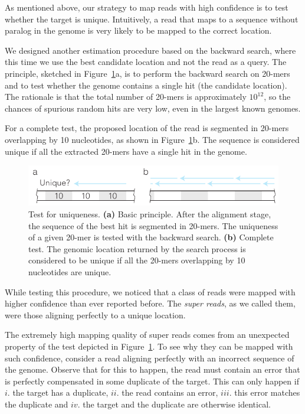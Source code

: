 \documentclass[a4,center,fleqn]{NAR}
\begin{document}
As mentioned above, our strategy to map reads with high confidence is to
test whether the target is unique. Intuitively, a read that maps to a
sequence without paralog in the genome is very likely to be mapped to the
correct location.

We designed another estimation procedure based on the backward search,
where this time we use the best candidate location and not the read as a
query. The principle, sketched in Figure~\ref{fig_supertest}a, is to
perform the backward search on 20-mers and to test whether the genome
contains a single hit (the candidate location). The rationale is that the
total number of 20-mers is approximately $10^{12}$, so the chances of
spurious random hits are very low, even in the largest known genomes.

For a complete test, the proposed location of the read is segmented in
20-mers overlapping by 10 nucleotides, as shown in
Figure~\ref{fig_supertest}b. The sequence is considered unique if all the
extracted 20-mers have a single hit in the genome.

\begin{figure}[t]
\begin{center}
\includegraphics[scale=.75]{supertest.pdf}
\end{center}
\caption{Test for uniqueness. \textbf{(a)} Basic principle. After the
alignment stage, the sequence of the best hit is segmented in 20-mers. The
uniqueness of a given 20-mer is tested with the backward search.
\textbf{(b)} Complete test. The genomic location returned by the search
process is considered to be unique if all the 20-mers overlapping by 10
nucleotides are unique.}
\label{fig_supertest}
\end{figure}

While testing this procedure, we noticed that a class of reads were mapped
with higher confidence than ever reported before. The \emph{super reads},
as we called them, were those aligning perfectly to a unique location.

The extremely high mapping quality of super reads comes from an unexpected
property of the test depicted in Figure~\ref{fig_supertest}. To see why
they can be mapped with such confidence, consider a read aligning
perfectly with an incorrect sequence of the genome. Observe that for
this to happen, the read must contain an error that is perfectly
compensated in some duplicate of the target. This can only happen if $i.$
the target has a duplicate, $ii.$ the read contains an error, $iii.$ this
error matches the duplicate and $iv.$ the target and the duplicate are
otherwise identical.
\end{document}
